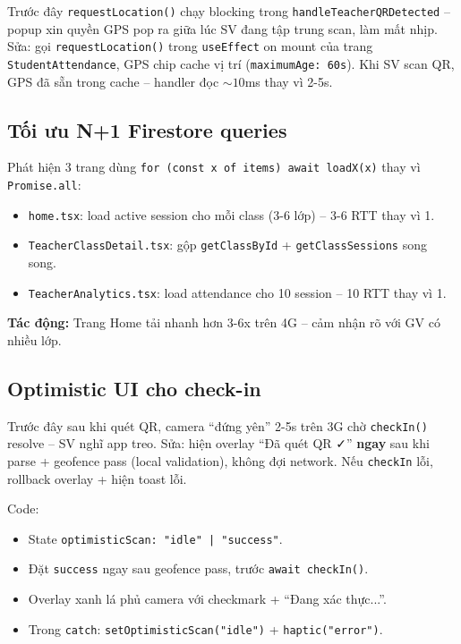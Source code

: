 \documentclass{article}
\begin{document}
Trước đây \texttt{requestLocation()} chạy blocking trong \texttt{handleTeacherQRDetected} -- popup xin quyền GPS pop ra giữa lúc SV đang tập trung scan, làm mất nhịp. Sửa: gọi \texttt{requestLocation()} trong \texttt{useEffect} on mount của trang \texttt{StudentAttendance}, GPS chip cache vị trí (\texttt{maximumAge: 60s}). Khi SV scan QR, GPS đã sẵn trong cache -- handler đọc ${\sim}10$ms thay vì 2-5s.

\subsection{Tối ưu N+1 Firestore queries}

Phát hiện 3 trang dùng \texttt{for (const x of items) await loadX(x)} thay vì \texttt{Promise.all}:

\begin{itemize}[leftmargin=1.5em]
  \item \texttt{home.tsx}: load active session cho mỗi class (3-6 lớp) -- 3-6 RTT thay vì 1.
  \item \texttt{TeacherClassDetail.tsx}: gộp \texttt{getClassById} + \texttt{getClassSessions} song song.
  \item \texttt{TeacherAnalytics.tsx}: load attendance cho 10 session -- 10 RTT thay vì 1.
\end{itemize}

\textbf{Tác động:} Trang Home tải nhanh hơn 3-6x trên 4G -- cảm nhận rõ với GV có nhiều lớp.

\subsection{Optimistic UI cho check-in}

Trước đây sau khi quét QR, camera ``đứng yên'' 2-5s trên 3G chờ \texttt{checkIn()} resolve -- SV nghĩ app treo. Sửa: hiện overlay ``Đã quét QR ✓'' \textbf{ngay} sau khi parse + geofence pass (local validation), không đợi network. Nếu \texttt{checkIn} lỗi, rollback overlay + hiện toast lỗi.

Code:
\begin{itemize}[leftmargin=1.5em]
  \item State \texttt{optimisticScan: "idle" | "success"}.
  \item Đặt \texttt{success} ngay sau geofence pass, trước \texttt{await checkIn()}.
  \item Overlay xanh lá phủ camera với checkmark + ``Đang xác thực...''.
  \item Trong \texttt{catch}: \texttt{setOptimisticScan("idle")} + \texttt{haptic("error")}.
\end{itemize}
\end{document}
